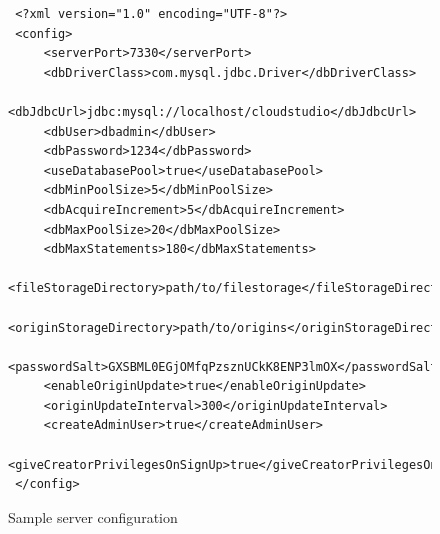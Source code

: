 \begin{figure}[h!]
\begin{lstlisting}
 <?xml version="1.0" encoding="UTF-8"?>
 <config>
     <serverPort>7330</serverPort>
     <dbDriverClass>com.mysql.jdbc.Driver</dbDriverClass>
     <dbJdbcUrl>jdbc:mysql://localhost/cloudstudio</dbJdbcUrl>
     <dbUser>dbadmin</dbUser>
     <dbPassword>1234</dbPassword>
     <useDatabasePool>true</useDatabasePool>
     <dbMinPoolSize>5</dbMinPoolSize>
     <dbAcquireIncrement>5</dbAcquireIncrement>
     <dbMaxPoolSize>20</dbMaxPoolSize>
     <dbMaxStatements>180</dbMaxStatements>
     <fileStorageDirectory>path/to/filestorage</fileStorageDirectory>
     <originStorageDirectory>path/to/origins</originStorageDirectory>
     <passwordSalt>GXSBML0EGjOMfqPzsznUCkK8ENP3lmOX</passwordSalt>
     <enableOriginUpdate>true</enableOriginUpdate>
     <originUpdateInterval>300</originUpdateInterval>
     <createAdminUser>true</createAdminUser>
     <giveCreatorPrivilegesOnSignUp>true</giveCreatorPrivilegesOnSignUp>
 </config>
\end{lstlisting}
  \centering
  \caption{Sample server configuration}
  \label{fig:serverconfig}
\end{figure}


